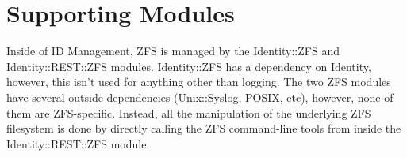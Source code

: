 \section{Supporting Modules}

Inside of ID Management, ZFS is managed by the Identity::ZFS and Identity::REST::ZFS modules. Identity::ZFS has a dependency on Identity, however, this isn't used for anything other than logging. The two ZFS modules have several outside dependencies (Unix::Syslog, POSIX, etc), however, none of them are ZFS-specific. Instead, all the manipulation of the underlying ZFS filesystem is done by directly calling the ZFS command-line tools from inside the Identity::REST::ZFS module.
